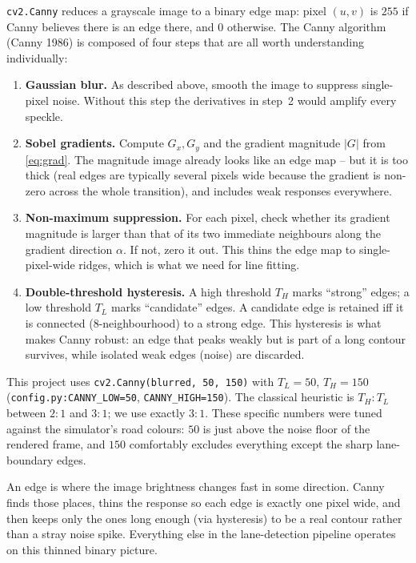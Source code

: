 \texttt{cv2.Canny} reduces a grayscale image to a binary edge map:
pixel $(u,v)$ is $255$ if Canny believes there is an edge there, and
$0$ otherwise. The Canny algorithm (Canny 1986) is composed of four
steps that are all worth understanding individually:
\begin{enumerate}[leftmargin=1.6em,itemsep=2pt]
  \item \textbf{Gaussian blur.} As described above, smooth the image
        to suppress single-pixel noise. Without this step the
        derivatives in step~2 would amplify every speckle.
  \item \textbf{Sobel gradients.} Compute $G_x,G_y$ and the gradient
        magnitude $|G|$ from \eqref{eq:grad}. The magnitude image
        already looks like an edge map -- but it is too thick (real
        edges are typically several pixels wide because the gradient
        is non-zero across the whole transition), and includes weak
        responses everywhere.
  \item \textbf{Non-maximum suppression.} For each pixel, check
        whether its gradient magnitude is larger than that of its two
        immediate neighbours along the gradient direction $\alpha$. If
        not, zero it out. This thins the edge map to single-pixel-wide
        ridges, which is what we need for line fitting.
  \item \textbf{Double-threshold hysteresis.} A high threshold $T_H$
        marks ``strong'' edges; a low threshold $T_L$ marks
        ``candidate'' edges. A candidate edge is retained iff it is
        connected (8-neighbourhood) to a strong edge. This hysteresis
        is what makes Canny robust: an edge that peaks weakly but is
        part of a long contour survives, while isolated weak edges
        (noise) are discarded.
\end{enumerate}
This project uses \texttt{cv2.Canny(blurred, 50, 150)} with
$T_L=50$, $T_H=150$ (\texttt{config.py:CANNY\_LOW=50},
\texttt{CANNY\_HIGH=150}). The classical heuristic is $T_H:T_L$
between $2{:}1$ and $3{:}1$; we use exactly $3{:}1$. These specific
numbers were tuned against the simulator's road colours: $50$ is just
above the noise floor of the rendered frame, and $150$ comfortably
excludes everything except the sharp lane-boundary edges.

\begin{intuition}
An edge is where the image brightness changes fast in some direction.
Canny finds those places, thins the response so each edge is exactly
one pixel wide, and then keeps only the ones long enough (via
hysteresis) to be a real contour rather than a stray noise spike.
Everything else in the lane-detection pipeline operates on this
thinned binary picture.
\end{intuition}

